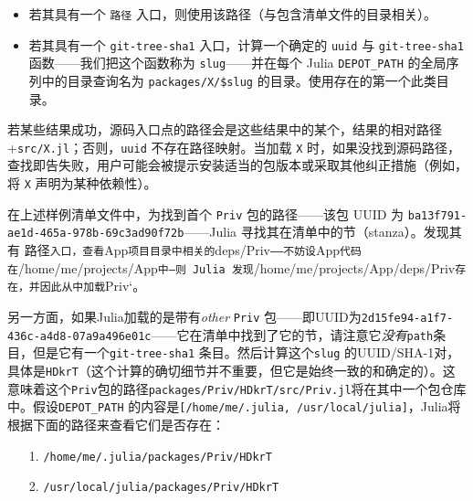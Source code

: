 \begin{itemize}
\item 若其具有一个 \texttt{路径} 入口，则使用该路径（与包含清单文件的目录相关）。


\item 若其具有一个 \texttt{git-tree-sha1} 入口，计算一个确定的 \texttt{uuid} 与 \texttt{git-tree-sha1} 函数——我们把这个函数称为 \texttt{slug}——并在每个 Julia \texttt{DEPOT\_PATH} 的全局序列中的目录查询名为 \texttt{packages/X/\$slug} 的目录。使用存在的第一个此类目录。

\end{itemize}


若某些结果成功，源码入口点的路径会是这些结果中的某个，结果的相对路径+\texttt{src/X.jl}；否则，\texttt{uuid} 不存在路径映射。当加载 \texttt{X} 时，如果没找到源码路径，查找即告失败，用户可能会被提示安装适当的包版本或采取其他纠正措施（例如，将 \texttt{X} 声明为某种依赖性）。



在上述样例清单文件中，为找到首个 \texttt{Priv} 包的路径——该包 UUID 为 \texttt{ba13f791-ae1d-465a-978b-69c3ad90f72b}——Julia 寻找其在清单中的节（stanza）。发现其有 路径\texttt{入口，查看}App\texttt{项目目录中相关的}deps/Priv\texttt{——不妨设}App\texttt{代码在}/home/me/projects/App\texttt{中—则 Julia 发现}/home/me/projects/App/deps/Priv\texttt{存在，并因此从中加载}Priv`。



另一方面，如果Julia加载的是带有\emph{other} \texttt{Priv} 包——即UUID为\texttt{2d15fe94-a1f7-436c-a4d8-07a9a496e01c}——它在清单中找到了它的节，请注意它\emph{没有}\texttt{path}条目，但是它有一个\texttt{git-tree-sha1} 条目。然后计算这个\texttt{slug} 的UUID/SHA-1对，具体是\texttt{HDkrT}（这个计算的确切细节并不重要，但它是始终一致的和确定的）。这意味着这个\texttt{Priv}包的路径\texttt{packages/Priv/HDkrT/src/Priv.jl}将在其中一个包仓库中。假设\texttt{DEPOT\_PATH} 的内容是\texttt{[{\textquotedbl}/home/me/.julia{\textquotedbl}, {\textquotedbl}/usr/local/julia{\textquotedbl}]}，Julia将根据下面的路径来查看它们是否存在：



\begin{itemize}
\item[1. ] \texttt{/home/me/.julia/packages/Priv/HDkrT}


\item[2. ] \texttt{/usr/local/julia/packages/Priv/HDkrT}

\end{itemize}


